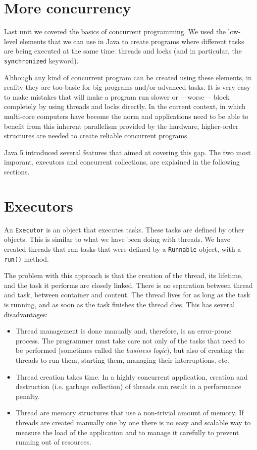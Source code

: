 \section{More concurrency}
\label{sec:more-concurrency}

Last unit we covered the basics of concurrent programming. We used the
low-level elements that we can use in Java to create programs where
different tasks are being executed at the same time: threads and
locks (and in particular, the \verb+synchronized+ keyword). 

Although any kind of concurrent program can be created using these
elements, in reality they are too basic for big programs and/or
advanced tasks. It is very easy to make mistakes that will make a
program run slower or ---worse--- block completely by using threads
and locks directly. In the current context, in which multi-core
computers have become the norm and applications need to be able to
benefit from this inherent parallelism provided by the hardware,
higher-order structures are needed to create reliable concurrent
programs. 

Java 5 introduced several features that aimed at covering this
gap. The two most imporant, executors and concurrent collections, are
explained in the following sections.


\section{Executors}
\label{sec:executors}

An \verb+Executor+ is an object that executes tasks. These tasks are
defined by other objects. 
%
This is similar to what we have been doing with threads. We have
created threads that ran tasks that were defined by a \verb+Runnable+
object, with a \verb+run()+ method. 

The problem with this approach is that the creation of the thread, its
lifetime, and the task it performs are closely linked. There is no
separation between thread and task, between container and
content. The thread lives for as long as the task is running, and as
soon as the task finishes the thread dies. This has several
disadvantages: 

\begin{itemize}
\item Thread management is done manually and, therefore, is an
  error-prone process. The programmer must take care not only of the
  tasks that need to be performed (sometimes called the \emph{business
  logic}), but also of creating 
  the threads to run them, starting them, managing their
  interruptions, etc. 
\item Thread creation takes time. In a highly concurrent application,
  creation and destruction (i.e. garbage collection) of threads can
  result in a performance penalty.
\item Thread are memory structures that use a non-trivial amount of
  memory. If threads are created manually one by one there is no
  easy and scalable way to measure the load of the application and to
  manage  
  it carefully to prevent running out of resources.
\end{itemize}

